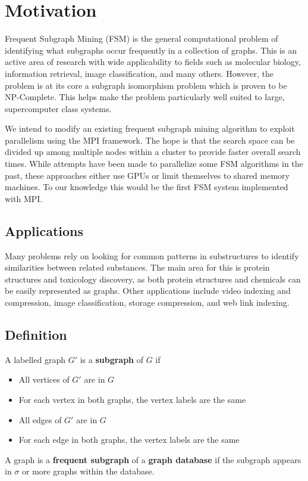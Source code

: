 \section{Motivation}
\label{sec:motivation}

Frequent Subgraph Mining (FSM) is the general computational problem of 
identifying what subgraphs occur frequently in a collection of graphs.  This 
is an active area of research with wide applicability to fields such as 
molecular biology, information retrieval, image classification, and many 
others.  However, the problem is at its core a subgraph isomorphism problem
which is proven to be NP-Complete\cite{cook1971complexity}.  This helps make
the problem particularly well suited to large, supercomputer class systems.

We intend to modify an existing frequent subgraph mining algorithm to exploit
parallelism using the MPI framework. The hope is that the search space can
be divided up among multiple nodes within a cluster to provide faster overall
search times.  While attempts have been made to parallelize some FSM 
algorithms in the past\cite{buehrer2005parallel,gspancuda}, these 
approaches either use GPUs or limit themselves to shared memory machines. 
To our knowledge this would be the first FSM system implemented with MPI.

\subsection{Applications}
\label{subsec:applications}

Many problems rely on looking for common patterns in substructures to 
identify similarities between related substances.  The main area 
for this is protein structures and toxicology discovery, as both 
protein structures\cite{substructures} and chemicals\cite{toxic} can be easily represented as 
graphs. Other applications include video indexing and compression\cite{videosub}, 
image classification\cite{de2012polynomial}\cite{plagram}, storage compression\cite{stored}, and web link 
indexing\cite{freqtrees}\cite{webgraphs}.

\subsection{Definition}
\label{subsec:complexity}

A labelled graph $G'$ is a {\bf subgraph} of $G$ if
\begin{itemize}
	\item{All vertices of $G'$ are in $G$}
	\item{For each vertex in both graphs, the vertex labels are the same}
	\item{All edges of $G'$ are in $G$ }
	\item{For each edge in both graphs, the vertex labels are the same}
\end{itemize}

A graph is a {\bf frequent subgraph} of a {\bf graph database} if the 
subgraph appears in $\sigma$ or more graphs within the database.


